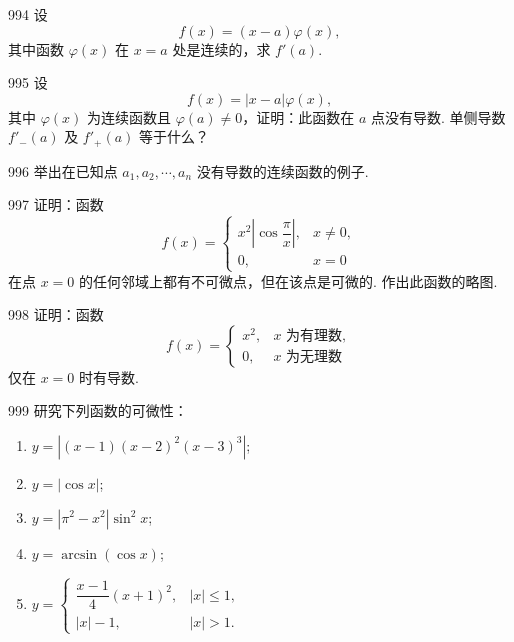 \begin{prob}[M]{994}
设
\[
f(x) = (x - a)\varphi(x),
\]
其中函数 $\varphi(x)$ 在 $x = a$ 处是连续的，求 $f'(a)$.
\end{prob}

\begin{prob}[M]{995}
设
\[
f(x) = |x - a|\varphi(x),
\]
其中 $\varphi(x)$ 为连续函数且 $\varphi(a) \neq 0$，证明：此函数在 $a$ 点没有导数. 单侧导数 $f'_-(a)$ 及 $f'_+(a)$ 等于什么？
\end{prob}

\begin{prob}[M]{996}
举出在已知点 $a_1, a_2, \cdots, a_n$ 没有导数的连续函数的例子.
\end{prob}

\begin{prob}[M]{997}
证明：函数
\[
f(x) = \begin{cases}
x^2 \left|\cos \dfrac{\pi}{x}\right|, & x \neq 0, \\
0, & x = 0
\end{cases}
\]
在点 $x = 0$ 的任何邻域上都有不可微点，但在该点是可微的. 作出此函数的略图.
\end{prob}

\begin{prob}[M]{998}
证明：函数
\[
f(x) = \begin{cases}
x^2, & x \text{ 为有理数}, \\
0, & x \text{ 为无理数}
\end{cases}
\]
仅在 $x = 0$ 时有导数.
\end{prob}

\begin{prob}[L]{999}
研究下列函数的可微性：
\begin{enumerate}[label=(\alph*), itemsep=2pt, topsep=3pt]
\item $y = |(x - 1)(x - 2)^2(x - 3)^3|$;
\item $y = |\cos x|$;
\item $y = |\pi^2 - x^2|\sin^2 x$;
\item $y = \arcsin(\cos x)$;
\item $y = \begin{cases} \dfrac{x - 1}{4}(x + 1)^2, & |x| \leqslant 1, \\ |x| - 1, & |x| > 1. \end{cases}$
\end{enumerate}
\end{prob}


